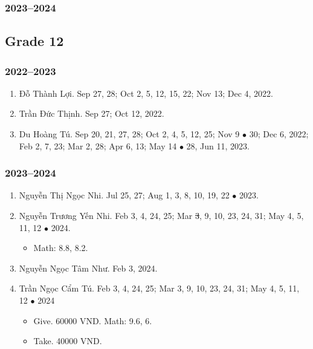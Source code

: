 \documentclass{article}
\begin{document}
\subsubsection{2023--2024}


\subsection{Grade 12}

\subsubsection{2022--2023}

\begin{enumerate}
	\item {\sc Đỗ Thành Lợi.} {\sf[In]} Sep 27, 28; Oct 2, 5, 12, 15, 22; Nov 13; Dec 4, 2022. {\sf[Out]}
	\item {\sc Trần Đức Thịnh.} {\sf[In]} Sep 27; Oct 12, 2022. {\sf[Out]}
	\item {\sc Du Hoàng Tú.} {\sf[In]} Sep 20, 21, 27, 28; Oct 2, 4, 5, 12, 25; Nov 9 $\bullet$ 30; Dec 6, 2022; Feb 2, 7, 23; Mar 2, 28; Apr 6, 13; May 14 $\bullet$ 28, Jun 11, 2023. {\sf[Out]}
\end{enumerate}

\subsubsection{2023--2024}

\begin{enumerate}
	\item {\sc Nguyễn Thị Ngọc Nhi.} {\sf[In]} Jul 25, 27; Aug 1, 3, 8, 10, 19, 22 $\bullet$ 2023. {\sf[Out]}
	\item {\sc Nguyễn Trương Yến Nhi.} {\sf[In]} Feb 3, 4, 24, 25; Mar \st{3}, 9, 10, 23, 24, 31; May 4, 5, 11, 12 $\bullet$ 2024.
	\begin{itemize}
		\item Math: 8.8, 8.2.
	\end{itemize}
	\item {\sc Nguyễn Ngọc Tâm Như.} {\sf[In]} Feb 3, 2024. {\sf[Out]}
	\item {\sc Trần Ngọc Cẩm Tú.} {\sf[In]} Feb 3, 4, 24, 25; Mar 3, 9, 10, 23, 24, 31; May 4, 5, 11, 12 $\bullet$ 2024
	\begin{itemize}
		\item {\sf Give.} 60000 VND. Math: 9.6, 6.
		\item {\sf Take.} 40000 VND.
	\end{itemize}
\end{enumerate}


\printbibliography[heading=bibintoc]
	
\end{document}
